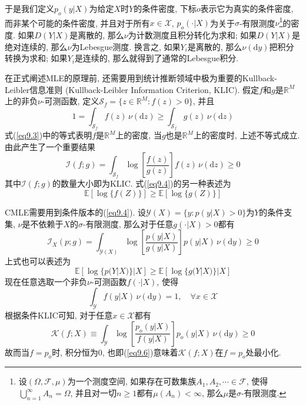 \documentclass[cn, 12pt, math=mtpro2, bibstyle=apa, blue, twocol]{elegantbook}
\newcommand{\R}{\mathbb{R}}
\newcommand{\E}{\mathbb{E}}
\begin{document}
于是我们定义$p_o(y|X)$为给定$X$时$Y$的条件密度, 下标$o$表示它为真实的条件密度, 而非某个可能的条件密度, 并且对于所有$x\in\mathscr{X}$, $p_o(\cdot|X)$为关于$\sigma$-有限测度$\nu$\footnote{设$(\Omega,\mathscr{F},\mu)$为一个测度空间, 如果存在可数集族$A_1,A_2,\cdots\in\mathscr{F}$, 使得$\bigcup_{n=1}^\infty A_n=\Omega$, 并且对一切$n\ge1$都有$\mu(A_n)<\infty$, 那么$\mu$是$\sigma$-有限测度.}的密度. 如果$D(Y|X)$是离散的, 那么$\nu$为计数测度且积分转化为求和; 如果$D(Y|X)$是绝对连续的, 那么$\nu$为Lebesgue测度. 换言之, 如果$Y_i$是离散的, 那么$\nu(\text{d}y)$把积分转换为求和; 如果$Y_i$是连续的, 那么就得到了通常的Lebesgue积分.


在正式阐述MLE的原理前, 还需要用到统计推断领域中极为重要的Kullback-Leibler信息准则 (Kullback-Leibler Information Criterion, KLIC). 假定$f$和$g$是$\R^M$上的非负$\nu$-可测函数, 定义$\mathscr{S}_f=\{z\in\R^M: f(z)>0\}$, 并且
\begin{equation}\label{eq9.3}
  1=\int_{\mathscr{S}_f}f(z)\,\nu(\text{d}z)\geq\int_{\mathscr{S}_f}g(z)\,\nu(\text{d}z)
\end{equation}
式(\ref{eq9.3})中的等式表明$f$是$\R^M$上的密度, 当$g$也是$\R^M$上的密度时, 上述不等式成立. 由此产生了一个重要结果
\begin{equation}\label{eq9.4}
  \mathscr{I}(f;g)=\int_{\mathscr{S}_f}\log\left[\frac{f(z)}{g(z)}\right]f(z)\,\nu(\text{d}z)\geq 0
\end{equation}
其中$\mathscr{I}(f;g)$的数量大小即为KLIC. 式(\ref{eq9.4})的另一种表述为
$$\E[\log\{f(Z)\}]\geq \E[\log\{g(Z)\}]$$

CMLE需要用到条件版本的(\ref{eq9.4}). 设$\mathscr{Y}(X)=\{y: p(y|X)>0\}$为$Y$的条件支集, $\nu$是不依赖于$X$的$\sigma$-有限测度, 那么对于任意$g(\cdot|X)>0$都有
$$\mathscr{I}_X(p;g)=\int_{\mathscr{Y}(X)}\log\left[\frac{p(y|X)}{g(y|X)}\right]p(y|X)\,\nu(\text{d}y)\geq 0$$
上式也可以表述为
$$\E[\log\{p(Y|X)\}|X]\geq \E[\log\{g(Y|X)\}|X]$$
现在任意选取一个非负$\nu$-可测函数$f(\cdot|X)$, 使得
\begin{equation}\label{eq9.5}
  \int_\mathscr{Y}f(y|X)\,\nu(\text{d}y)=1,\quad \forall x\in\mathscr{X}
\end{equation}
根据条件KLIC可知, 对于任意$x\in\mathscr{X}$都有
\begin{equation}\label{eq9.6}
  \mathscr{K}(f;X)\equiv\int_\mathscr{Y}\log\left[\frac{p_o(y|X)}{f(y|X)}\right]p_o(y|X)\,\nu(\text{d}y)\geq0
\end{equation}
故而当$f=p_o$时, 积分恒为0, 也即(\ref{eq9.6})意味着$\mathscr{K}(f;X)$在$f=p_o$处最小化.
\end{document}
